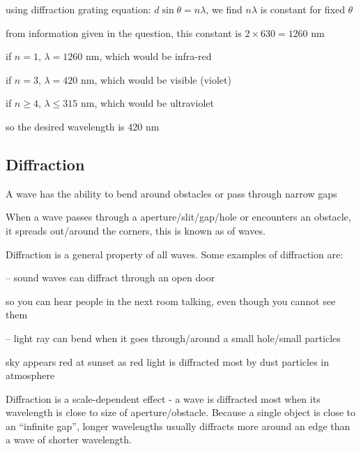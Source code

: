 
\begin{soln} using diffraction grating equation: $d \sin\theta = n\lambda$, we find $n\lambda$ is constant for fixed $\theta$

from information given in the question, this constant is $ 2\times630 = 1260 \text{ nm}$

if $n=1$, $\lambda = 1260 \text{ nm}$, which would be infra-red

if $n=3$, $\lambda = 420 \text{ nm}$, which would be visible (violet)

if $n\geq 4$, $\lambda \leq 315 \text{ nm}$, which would be ultraviolet

so the desired wavelength is 420 nm \end{soln}


\subsection{Diffraction}

A wave has the ability to bend around obstacles or pass through narrow gaps

\begin{ilight}
	When a wave passes through a aperture/slit/gap/hole or encounters an obstacle, it spreads out/around the corners, this is known as  of waves.
\end{ilight}

Diffraction is a general property of all waves. Some examples of diffraction are:

\begin{compactitem}
	\item[--] sound waves can diffract through an open door
	
	so you can hear people in the next room talking, even though you cannot see them
	
	\item[--] light ray can bend when it goes through/around a small hole/small particles
	
	sky appears red at sunset as red light is diffracted most by dust particles in atmosphere
\end{compactitem}

Diffraction is a scale-dependent effect - a wave is diffracted most when its wavelength is close to size of aperture/obstacle. Because a single object is close to an ``infinite gap'', longer wavelengths usually diffracts more around an edge than a wave of shorter wavelength.

